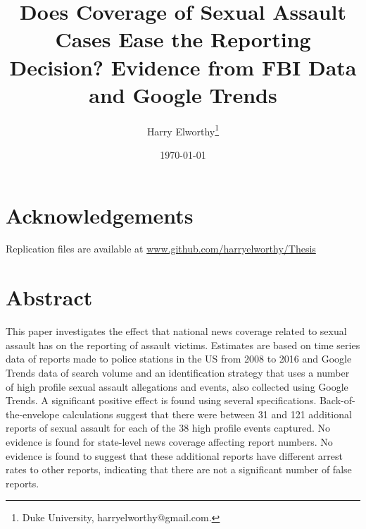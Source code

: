 \documentclass[AER,draftmode]{AEA}
\begin{document}

\title{Does Coverage of Sexual Assault Cases Ease the Reporting Decision? Evidence from FBI Data and Google Trends}
\author{Harry Elworthy\thanks{Duke University, harryelworthy@gmail.com.}}
\date{\today}
\pubMonth{}
\pubYear{}
\pubVolume{}
\pubIssue{}
\JEL{}
\Keywords{}

\maketitle


\section{Acknowledgements}

Replication files are available at \url{www.github.com/harryelworthy/Thesis}

\clearpage
\section{Abstract}

This paper investigates the effect that national news coverage related to sexual assault has on the reporting of assault victims. Estimates are based on time series data of reports made to police stations in the US from 2008 to 2016 and Google Trends data of search volume and an identification strategy that uses a number of high profile sexual assault allegations and events, also collected using Google Trends. A significant positive effect is found using several specifications. Back-of-the-envelope calculations suggest that there were between 31 and 121 additional reports of sexual assault for each of the 38 high profile events captured. No evidence is found for state-level news coverage affecting report numbers. No evidence is found to suggest that these additional reports have different arrest rates to other reports, indicating that there are not a significant number of false reports.\\





\end{document}
